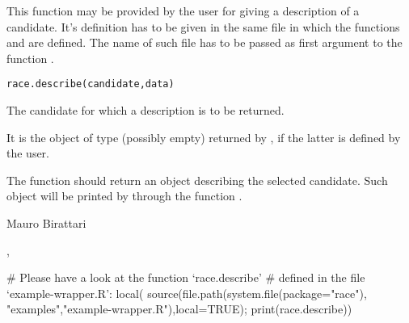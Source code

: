 \begin{Description}\relax
This function may be provided by the user for giving a
description of a candidate. It's definition has to be given
in the same file in which the functions  and
 are defined.
The name of such file has to be passed as first argument to the
function .
\end{Description}
\begin{Usage}
\begin{verbatim}race.describe(candidate,data)\end{verbatim}
\end{Usage}
\begin{Arguments}
\begin{ldescription}
\item[\code{candidate}] The candidate for which a description is to be
returned.
\item[\code{data}] It is the object of type  (possibly empty)
returned by , if the latter is defined by the
user.
\end{ldescription}
\end{Arguments}
\begin{Value}
The function  should return an object
describing the selected candidate. Such object will be printed by
 through the function .
\end{Value}
\begin{Author}\relax
Mauro Birattari
\end{Author}
\begin{SeeAlso}\relax
{}, 
\end{SeeAlso}
\begin{Examples}
\begin{ExampleCode}
# Please have a look at the function `race.describe'
# defined in the file `example-wrapper.R':
local({
  source(file.path(system.file(package="race"),
                           "examples","example-wrapper.R"),local=TRUE);
  print(race.describe)})
\end{ExampleCode}
\end{Examples}

